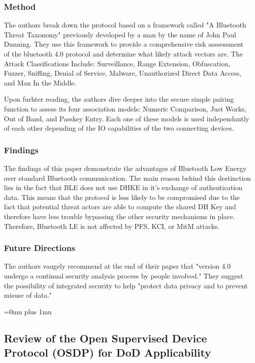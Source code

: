 \subsubsection{Method}

\noindent
The authors break down the protocol based on a framework called "A Bluetooth Threat Taxonomy" previously developed by a man by the name of John Paul Dunning. They use this framework to provide a comprehensive risk asssessment of the bluetooth 4.0 protocol and determine what likely attack vectors are. The Attack Classifications Include: Surveillance, Range Extension, Obfuscation, Fuzzer, Sniffing, Denial of Service, Malware, Unauthorized Direct Data Access, and Man In the Middle.

Upon furhter reading, the authors dive deeper into the secure simple pairing function to assess its four association models: Numeric Comparison, Just Works, Out of Band, and Passkey Entry. Each one of these models is used independantly of each other depending of the IO capabilities of the two connecting devices.

\subsubsection{Findings}

\noindent
The findings of this paper demonstrate the advantages of Bluetooth Low Energy over standard Bluetooth communication. The main reason behind this destinction lies in the fact that BLE does not use DHKE in it's exchange of authentication data. This means that the protocol is less likely to be compromised due to the fact that potential threat actors are able to compute the shared DH Key and therefore have less trouble bypassing the other security mechanisms in place. Therefore, Bluetooth LE is not affected by PFS, KCI, or MitM attacks.

\subsubsection{Future Directions}

\noindent
The authors vaugely recommend at the end of their paper that "version 4.0 undergo a continual security analysis process by people involved." They suggest the possibility of integrated security to help "protect data privacy and to prevent misuse of data."

\Urlmuskip=0mu plus 1mu\relax

\noindent
\subsection{{R}eview of the {O}pen {S}upervised {D}evice {P}rotocol ({OSDP}) for {D}o{D} {A}pplicability}

